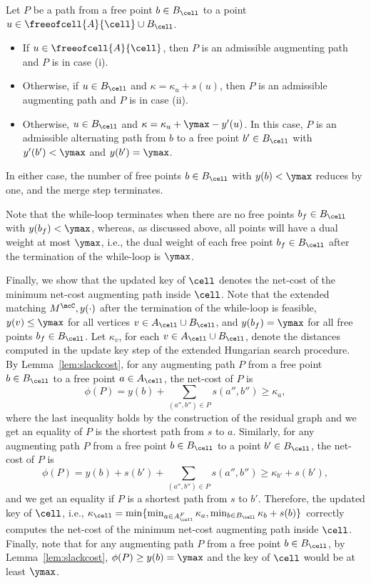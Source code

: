      Let $P$ be a path from a free point $b\in B_\cell$ to a point $u\in \freeofcell{A}{\cell}\cup B_\cell$.
    \begin{itemize}
        \item If $u\in\freeofcell{A}{\cell}$, then $P$ is an admissible augmenting path and $P$ is in case (i).
        \item Otherwise, if $u\in B_\cell$ and $\kappa=\kappa_u+s(u)$, then $P$ is an admissible augmenting path and $P$ is in case (ii).
        \item Otherwise, $u\in B_\cell$ and $\kappa=\kappa_u+\ymax - y'(u)$. In this case, $P$ is an admissible alternating path from $b$ to a free point $b'\in B_\cell$ with $y'(b') < \ymax$ and $y(b')=\ymax$. 
    \end{itemize}
    In either case, the number of free points $b\in B_\cell$ with $y(b)<\ymax$ reduces by one, and the merge step terminates.

     Note that the while-loop terminates when there are no free points $b_f\in B_\cell$ with $y(b_f)<\ymax$, whereas, as discussed above, all points will have a dual weight at most $\ymax$, i.e., the dual weight of each free point $b_f\in B_\cell$ after the termination of the while-loop is $\ymax$.

    
 Finally, we show that the updated key of $\cell$ denotes the net-cost of the minimum net-cost augmenting path inside $\cell$. Note that the extended matching $M^\mcC, y(\cdot)$ after the termination of the while-loop is feasible, $y(v)\le \ymax$ for all vertices $v\in A_\cell\cup B_\cell$, and $y(b_f)=\ymax$ for all free points $b_f\in B_\cell$. Let $\kappa_v$, for each $v\in A_\cell\cup B_\cell$, denote the distances computed in the update key step of the extended Hungarian search procedure. By Lemma~\ref{lem:slackcost}, for any augmenting path $P$ from a free point $b\in B_\cell$ to a free point $a\in A_\cell$, the net-cost of $P$ is 
\[\phi(P)=y(b) +\sum_{(a'',b'')\in P}s(a'',b'') \ge \kappa_a,\] where the last inequality holds by the construction of the residual graph and we get an equality of $P$ is the shortest path from $s$ to $a$. Similarly, for any augmenting path $P$ from a free point $b\in B_\cell$ to a point $b'\in B_\cell$, the net-cost of $P$ is 
\[\phi(P)=y(b) + s(b') +\sum_{(a'',b'')\in P}s(a'',b'') \ge \kappa_{b'} + s(b'),\]
and we get an equality if $P$ is a shortest path from $s$ to $b'$.
Therefore, the updated key of $\cell$, i.e., $\kappa_\cell=\min\{\min_{a\in A_\cell^F}\kappa_a, \min_{b\in B_\cell}\kappa_b+s(b)\}$ correctly computes the net-cost of the minimum net-cost augmenting path inside $\cell$. Finally, note that for any augmenting path $P$ from a free point $b\in B_\cell$, by Lemma~\ref{lem:slackcost}, $\phi(P)\ge y(b)=\ymax$ and the key of $\cell$ would be at least $\ymax$.









